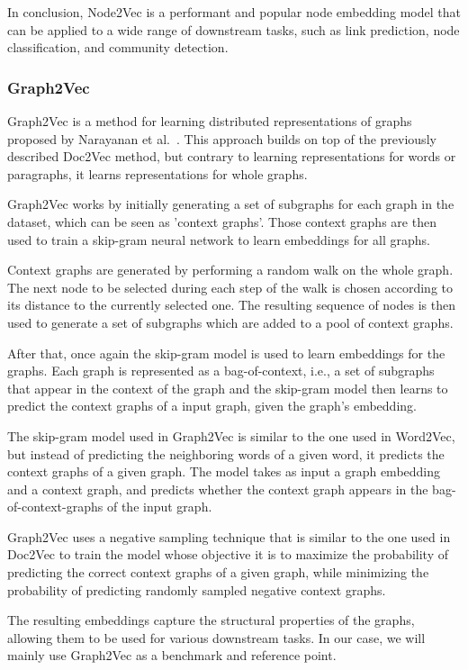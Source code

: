 In conclusion, Node2Vec is a performant and popular node embedding model that can be applied to a wide range of downstream tasks, such as link prediction, node classification, and community detection.

\subsubsection{Graph2Vec}
Graph2Vec is a method for learning distributed representations of graphs proposed by Narayanan et al.~\cite{2017graph2vec}. This approach builds on top of the previously described Doc2Vec method, but contrary to learning representations for words or paragraphs, it learns representations for whole graphs.

Graph2Vec works by initially generating a set of subgraphs for each graph in the dataset, which can be seen as 'context graphs'. Those context graphs are then used to train a skip-gram neural network to learn embeddings for all graphs.

Context graphs are generated by performing a random walk on the whole graph. The next node to be selected during each step of the walk is chosen according to its distance to the currently selected one. The resulting sequence of nodes is then used to generate a set of subgraphs which are added to a pool of context graphs.

After that, once again the skip-gram model is used to learn embeddings for the graphs. Each graph is represented as a bag-of-context, i.e., a set of subgraphs that appear in the context of the graph and the skip-gram model then learns to predict the context graphs of a input graph, given the graph's embedding.

The skip-gram model used in Graph2Vec is similar to the one used in Word2Vec, but instead of predicting the neighboring words of a given word, it predicts the context graphs of a given graph. The model takes as input a graph embedding and a context graph, and predicts whether the context graph appears in the bag-of-context-graphs of the input graph.

Graph2Vec uses a negative sampling technique that is similar to the one used in Doc2Vec to train the model whose objective it is to maximize the probability of predicting the correct context graphs of a given graph, while minimizing the probability of predicting randomly sampled negative context graphs.

The resulting embeddings capture the structural properties of the graphs, allowing them to be used for various downstream tasks. In our case, we will mainly use Graph2Vec as a benchmark and reference point.


